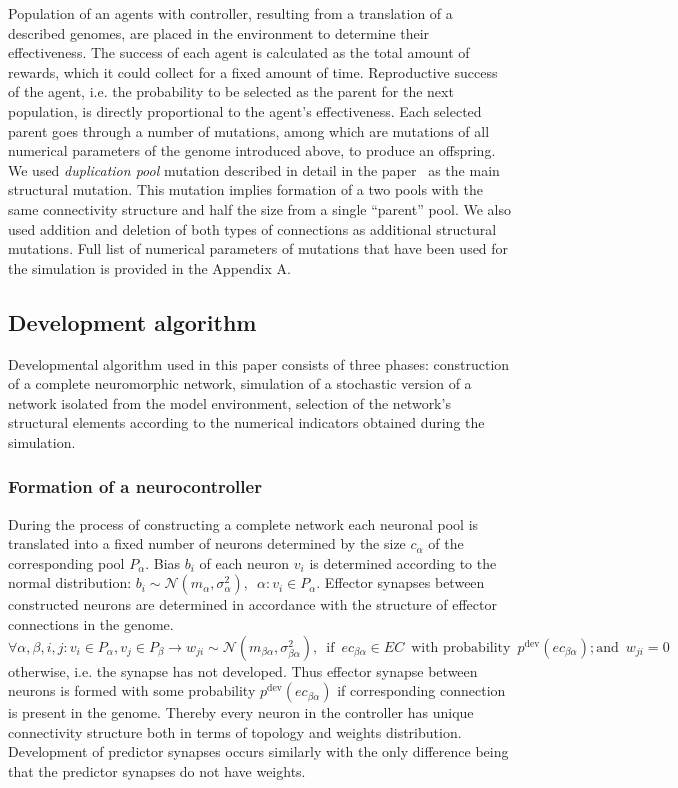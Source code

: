 \documentclass[letterpaper]{article}
\begin{document}
Population of an agents with controller, resulting from a translation of a described genomes, are placed in the environment to determine their effectiveness. The success of each agent is calculated as the total amount of rewards, which it could collect for a fixed amount of time. Reproductive success of the agent, i.e. the probability to be selected as the parent for the next population, is directly proportional to the agent's effectiveness. Each selected parent goes through a number of mutations, among which are mutations of all numerical parameters of the genome introduced above, to produce an offspring. We used {\em duplication pool} mutation described in detail in the paper~\citep{LakhmanBurtsev2013} as the main structural mutation. This mutation implies formation of a two pools with the same connectivity structure and half the size from a single ``parent'' pool. We also used addition and deletion of both types of connections as additional structural mutations. Full list of numerical parameters of mutations that have been used for the simulation is provided in the Appendix A.

\subsection{Development algorithm}

Developmental algorithm used in this paper consists of three phases: construction of a complete neuromorphic network, simulation of a stochastic version of a network isolated from the model environment, selection of the network's structural elements according to the numerical indicators obtained during the simulation.

\subsubsection{Formation of a neurocontroller} During the process of constructing a complete network each neuronal pool is translated into a fixed number of neurons determined by the size $c_{\alpha}$ of the corresponding pool $P_{\alpha}$. Bias $b_{i}$ of each neuron $v_{i}$ is determined according to the normal distribution: $b_{i}\sim \mathcal{N} \left(m_{\alpha},\sigma^2_{\alpha}\right), \enspace \alpha : v_{i} \in P_{\alpha}$. Effector synapses between constructed neurons are determined in accordance with the structure of effector connections in the genome. $\forall \alpha, \beta, i, j : v_{i} \in P_{\alpha}, v_{j} \in P_{\beta} \rightarrow w_{ji} \sim \mathcal{N} \left(m_{\beta\alpha},\sigma^2_{\beta\alpha}\right),\enspace \mbox{if} \enspace ec_{\beta\alpha} \in EC \enspace \mbox{with probability} \enspace p^{\mathrm{dev}}\left(ec_{\beta\alpha}\right); \mbox{and} \enspace w_{ji} = 0$ otherwise, i.e. the synapse has not developed. Thus effector synapse between neurons is formed with some probability $p^{\mathrm{dev}}\left(ec_{\beta\alpha}\right)$ if corresponding connection is present in the genome. Thereby every neuron in the controller has unique connectivity structure both in terms of topology and weights distribution. Development of predictor synapses occurs similarly with the only difference being that the predictor synapses do not have weights.
\end{document}
